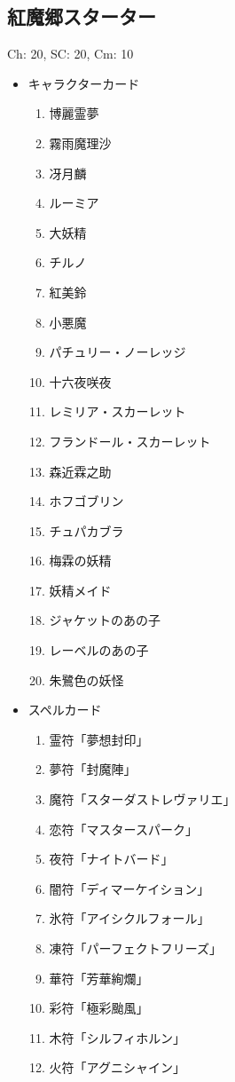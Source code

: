 \documentclass[line_length=22zw,number_of_lines=45,twocolumn]{jlreq}
\begin{document}
\subsection{紅魔郷スターター}
Ch: 20, SC: 20, Cm: 10
\begin{itemize}
	\item キャラクターカード
		\begin{enumerate}
			\item 博麗霊夢
			\item 霧雨魔理沙
			\item 冴月麟
			\item ルーミア
			\item 大妖精
			\item チルノ
			\item 紅美鈴
			\item 小悪魔
			\item パチュリー・ノーレッジ
			\item 十六夜咲夜
			\item レミリア・スカーレット
			\item フランドール・スカーレット
			\item 森近霖之助
			\item ホフゴブリン
			\item チュパカブラ
			\item 梅霖の妖精
			\item 妖精メイド
			\item ジャケットのあの子
			\item レーベルのあの子
			\item 朱鷺色の妖怪
		\end{enumerate}
	\item スペルカード
		\begin{enumerate}
			\item 霊符「夢想封印」
			\item 夢符「封魔陣」
			\item 魔符「スターダストレヴァリエ」
			\item 恋符「マスタースパーク」
			\item 夜符「ナイトバード」
			\item 闇符「ディマーケイション」
			\item 氷符「アイシクルフォール」
			\item 凍符「パーフェクトフリーズ」
			\item 華符「芳華絢爛」
			\item 彩符「極彩颱風」
			\item 木符「シルフィホルン」
			\item 火符「アグニシャイン」

\end{enumerate}
\end{itemize}
\end{document}
